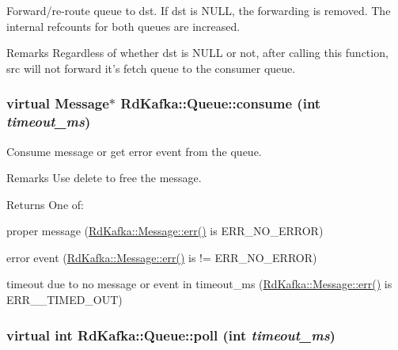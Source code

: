 Forward/re-\/route queue to {\ttfamily dst}. If {\ttfamily dst} is {\ttfamily NULL}, the forwarding is removed. The internal refcounts for both queues are increased.

\begin{DoxyRemark}{Remarks}
Regardless of whether {\ttfamily dst} is NULL or not, after calling this function, {\ttfamily src} will not forward it's fetch queue to the consumer queue. 
\end{DoxyRemark}
\hypertarget{classRdKafka_1_1Queue_aa8a0ff1e3df108e8bb6c9ef611f5eef4}{
\subsubsection[{consume}]{\setlength{\rightskip}{0pt plus 5cm}virtual {\bf Message}$\ast$ RdKafka::Queue::consume (int {\em timeout\_\-ms})}}
\label{classRdKafka_1_1Queue_aa8a0ff1e3df108e8bb6c9ef611f5eef4}


Consume message or get error event from the queue. \begin{DoxyRemark}{Remarks}
Use {\ttfamily delete} to free the message.
\end{DoxyRemark}
\begin{DoxyReturn}{Returns}
One of:
\begin{DoxyItemize}
\item proper message (\hyperlink{classRdKafka_1_1Message_a90df1fd2a73a74220c9581e6bedb42f2}{RdKafka::Message::err()} is ERR\_\-NO\_\-ERROR)
\item error event (\hyperlink{classRdKafka_1_1Message_a90df1fd2a73a74220c9581e6bedb42f2}{RdKafka::Message::err()} is != ERR\_\-NO\_\-ERROR)
\item timeout due to no message or event in {\ttfamily timeout\_\-ms} (\hyperlink{classRdKafka_1_1Message_a90df1fd2a73a74220c9581e6bedb42f2}{RdKafka::Message::err()} is ERR\_\-\_\-TIMED\_\-OUT) 
\end{DoxyItemize}
\end{DoxyReturn}
\hypertarget{classRdKafka_1_1Queue_a4d37e2fdf4579876f4ae3f315bc2e74d}{
\subsubsection[{poll}]{\setlength{\rightskip}{0pt plus 5cm}virtual int RdKafka::Queue::poll (int {\em timeout\_\-ms})}}
\label{classRdKafka_1_1Queue_a4d37e2fdf4579876f4ae3f315bc2e74d}


